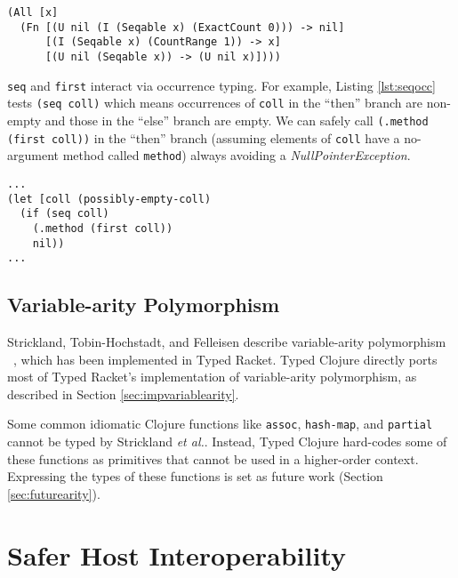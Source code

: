 \begin{lstlisting}[caption=Type associated with clojure.core/first, label=lst:firsttype]
(All [x]
  (Fn [(U nil (I (Seqable x) (ExactCount 0))) -> nil]
      [(I (Seqable x) (CountRange 1)) -> x]
      [(U nil (Seqable x)) -> (U nil x)])))
\end{lstlisting}

\lstinline|seq| and \lstinline|first| interact via occurrence typing.
For example, Listing \ref{lst:seqocc} tests
\lstinline|(seq coll)| which means occurrences of \lstinline|coll|
in the ``then'' branch are non-empty and those in the
``else'' branch are empty.
We can safely call \lstinline|(.method (first coll))| in the ``then''
branch (assuming elements of \lstinline|coll| have a no-argument method called \lstinline|method|)
always avoiding a \emph{NullPointerException}.

\begin{lstlisting}[caption=Example of using the sequence abstraction with occurrence typing, label=lst:seqocc]
...
(let [coll (possibly-empty-coll)
  (if (seq coll)
    (.method (first coll))
    nil))
...
\end{lstlisting}

\subsection{Variable-arity Polymorphism}

Strickland, Tobin-Hochstadt, and Felleisen describe variable-arity poly\-morphism ~\cite{STF09},
which has been implemented in Typed Racket.
Typed Clojure directly ports most of Typed Racket's implementation of variable-arity polymorphism,
as described in Section \ref{sec:impvariablearity}.

Some common idiomatic Clojure functions like \lstinline|assoc|, \lstinline|hash-map|,
and \lstinline|partial| cannot be typed by Strickland \emph{et al.}.
Instead, Typed Clojure hard-codes some of these functions as primitives that cannot
be used in a higher-order context.
Expressing the types of these functions is set as future work (Section \ref{sec:futurearity}).

\section{Safer Host Interoperability}

